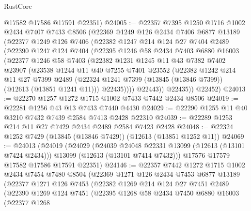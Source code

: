 \begin{lexlean}{RustCore}
\begin{coremodule}
      @17582
      @17586
      @17591
      @22351)
@24005 := @22357
    @7395
    @1250
    @1716
    @1002
    @2434
    @7407
    @7433
    @8506
    (@22369
      @1249
      @126
      @2434
      @7406
      @6877
      @13189
      (@22377
        @1249
        @126
        @7406
        (@22382
          @1247
          @214
          @124
          @27
          @7404
          @2489
          (@22390
            @1247
            @124
            @7404
            (@22395
              @1246
              @58
              @2434
              @7403
              @6880
              @16003
              (@22377
                @1246
                @58
                @7403
                (@22382
                  @1231
                  @1245
                  @11
                  @43
                  @7382
                  @7402
                  @23907
                  (@23538
                    @1244
                    @11
                    @40
                    @7255
                    @7401
                    @23552
                    (@22382
                      @1242
                      @214
                      @11
                      @27
                      @7399
                      @2489
                      (@22324 @1241 @7399 (@13845 (@13846 @7399)) (@12613 (@13851 @1241 @11)))
                      @22435))))
              @22443))
          @22435))
      @22452)
@24013 := @22270 @1257 @1272 @1715 @1002 @7433 @7442 @2434 @8506
@24019 := @22281 @1256 @43 @13 @7433 @7440 @4430
@24029 := @22290 @1255 @11 @40 @3210 @7432 @7439 @2584 @7413 @2428 @22310
@24039 := @22289 @1253 @214 @11 @27 @7429 @2434 @2489 @2584 @7423 @2428
@24048 := @22324 @1252 @7429 (@13845 (@13846 @7429)) (@12613 (@13851 @1252 @11))
@24069 := @24013
    (@24019
      (@24029
        (@24039 @24048 @22331 @13099 (@12613 (@13101 @7424 @2434)))
        @13099
        (@12613 (@13101 @7414 @7432)))
      @17576
      @17579
      @17582
      @17586
      @17591
      @22351)
@24146 := @22357
    @7442
    @1272
    @1715
    @1002
    @2434
    @7454
    @7480
    @8504
    (@22369
      @1271
      @126
      @2434
      @7453
      @6877
      @13189
      (@22377
        @1271
        @126
        @7453
        (@22382
          @1269
          @214
          @124
          @27
          @7451
          @2489
          (@22390
            @1269
            @124
            @7451
            (@22395
              @1268
              @58
              @2434
              @7450
              @6880
              @16003
              (@22377
                @1268

\end{coremodule}
\end{lexlean}
